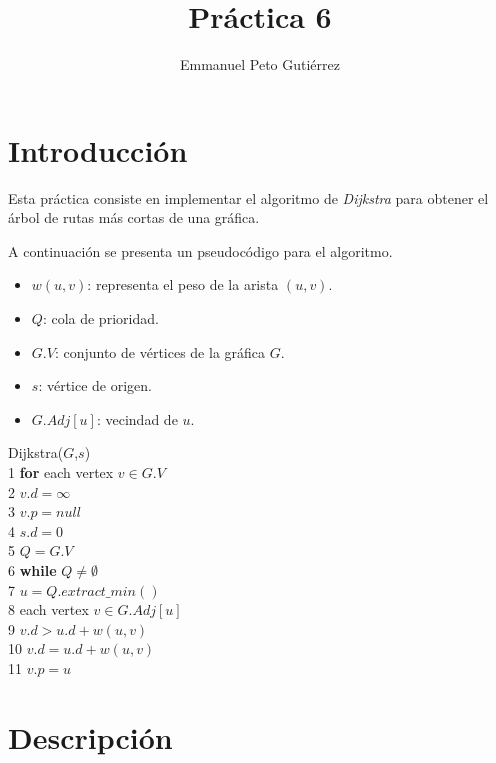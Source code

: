 \documentclass{article}
\title{Práctica 6}
\author{Emmanuel Peto Gutiérrez}
\begin{document}
\maketitle

\section{Introducción}

Esta práctica consiste en implementar el algoritmo de \emph{Dijkstra} para obtener el árbol de rutas más cortas de una gráfica.

A continuación se presenta un pseudocódigo para el algoritmo.

\begin{itemize}
\item $w(u,v)$: representa el peso de la arista $(u,v)$.
\item $Q$: cola de prioridad.
\item $G.V$: conjunto de vértices de la gráfica $G$.
\item $s$: vértice de origen.
\item $G.Adj[u]$: vecindad de $u$.
\end{itemize}

Dijkstra($G$,$s$)\\
\phantom{1}1 {\bf for} each vertex $v \in G.V$\\
\phantom{1}2 \hspace{5mm}$v.d = \infty$\\
\phantom{1}3 \hspace{5mm}$v.p = null$\\
\phantom{1}4 $s.d = 0$\\
\phantom{1}5 $Q = G.V$\\
\phantom{1}6 {\bf while} $Q \not = \emptyset$\\
\phantom{1}7 \hspace{5mm}$u = Q.extract\_min()$\\
\phantom{1}8 \hspace{5mm}{\bf for} each vertex $v \in G.Adj[u]$\\
\phantom{1}9 \hspace{10mm}{\bf if} $v.d > u.d + w(u,v)$\\
10 \hspace{15mm}$v.d = u.d + w(u,v)$\\
11 \hspace{15mm}$v.p = u$

\section{Descripción}
\end{document}

